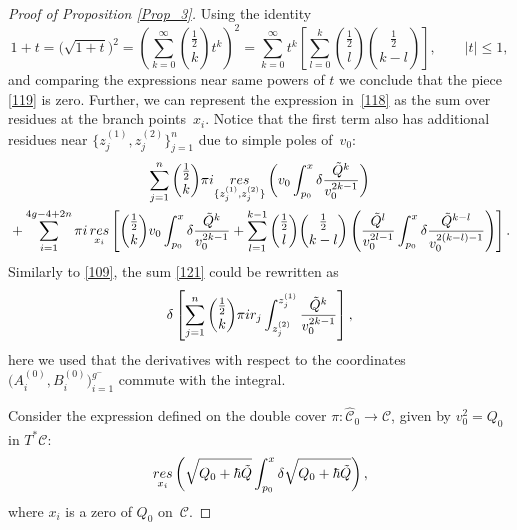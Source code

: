 \documentclass[10pt,a4paper]{article}
\numberwithin{equation}{section}
\theoremstyle{definition}
\begin{document}
\begin{proof}[Proof of Proposition \ref{Prop_3}]
Using the identity
\begin{equation*}%
1+t=\big(\sqrt{1+t}\big)^2=\left(\sum^{\infty}_{k=0}\binom{\frac{1}{2}}{k}t^k \right)^2=\sum^{\infty}_{k=0}t^k \left[\sum^k_{l=0}\binom{\frac{1}{2}}{l} \binom{\frac{1}{2}}{k-l} \right], \qquad |t| \leq 1, \end{equation*}
and comparing the expressions near same powers of $t$ we conclude that the piece \eqref{119} is zero. Further, we can represent the expression in~\eqref{118} as the sum over residues at the branch points~$x_i$. Notice that the first term also has additional residues near $\big\{z^{(1)}_j, z^{(2)}_j \big\}^n_{j=1}$ due to simple poles of~$v_0$:
\begin{gather}\label{121}
\sum^n_{j=1}\binom{\frac{1}{2}}{k}\pi {\rm i}\underset{\{z^{(1)}_j, z^{(2)}_j \}}{\rm res}\left(v_0
\int^x_{p_0}\delta\frac{\tilde{Q}^k}{v_0^{2k-1}} \right)\\
 \label{122}
 {}+\sum^{4g-4+2n}_{i=1}\pi{\rm i} \, \underset{x_i}{\rm res}\left[\binom{\frac{1}{2}}{k}v_0
\int^x_{p_0}\delta\frac{\tilde{Q}^k}{v_0^{2k-1}}+ \sum^{k-1}_{l=1}\binom{\frac{1}{2}}{l} \binom{\frac{1}{2}}{k-l}\left(\frac{\tilde{Q}^l}{v_0^{2l-1}}
\int^x_{p_0}\delta \frac{\tilde{Q}^{k-l}}{v_0^{2(k-l)-1}}\right)\right].
\end{gather}
Similarly to \eqref{109}, the sum \eqref{121} could be rewritten as
\begin{equation}\label{123}\delta\left[\sum^n_{j=1}\binom{\frac{1}{2}}{k}
\pi {\rm i} r_j \int^{z^{(1)}_j}_{z^{(2)}_j}\frac{\tilde{Q}^k}{v_0^{2k-1}} \right],\end{equation}
here we used that the derivatives with respect to the coordinates $\big(A^{(0)}_i, B^{(0)}_i\big)^{g^-}_{i=1}$ commute with the integral.

Consider the expression defined on the double cover $\pi\colon \hat{\mathcal{C}}_0 \xrightarrow[]{} \mathcal{C}$, given by $v^2_0=Q_0$ in $T^*\mathcal{C}$:
\begin{equation*}%
\underset{x_i}{\rm res}\left(\sqrt{Q_0+\hbar \tilde{Q}}\int^x_{p_0} \delta \sqrt{Q_0+\hbar \tilde{Q}}\right),
\end{equation*} where $x_i$ is a zero of $Q_0$ on~$\mathcal{C}$.


\end{proof}
\end{document}
